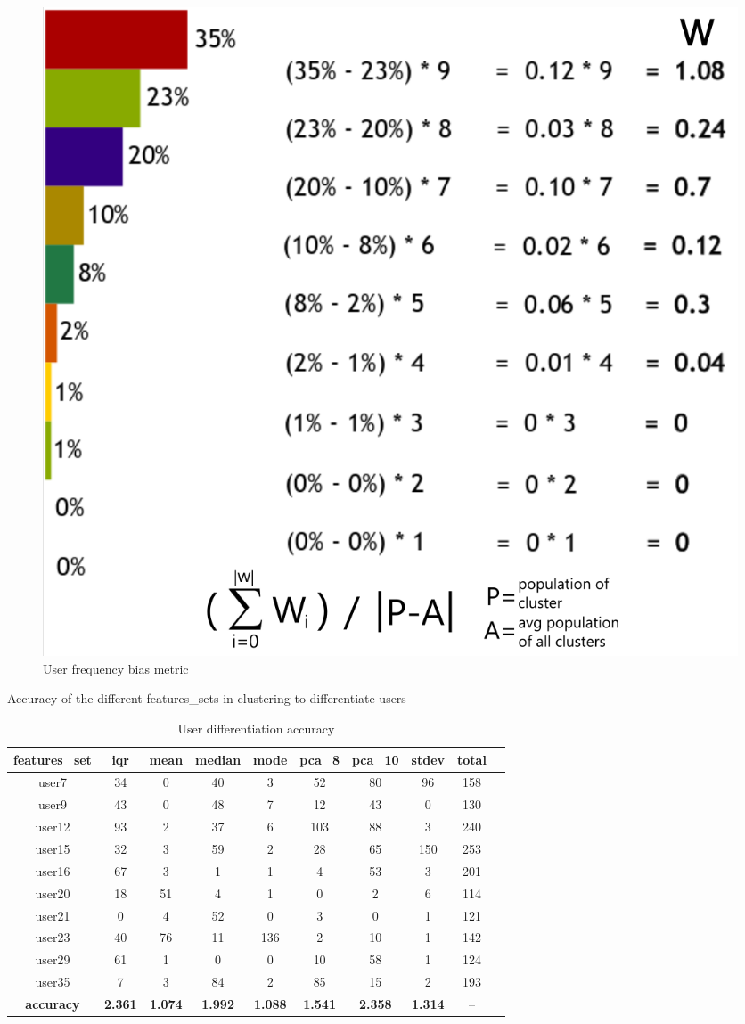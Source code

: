 \begin{figure}[h!]
	\includegraphics[width=.8\columnwidth]{figures/user_freq_distribution}

	\caption{User frequency bias metric}
	\label{fig:user_freq_bias_metric}
\end{figure}

\begin{table}[h!]
	\centering
	\caption{User differentiation accuracy}
	{\small Accuracy of the different features{\_}sets in clustering to differentiate users}
	\bigskip
	\label{tab:user-differentiation-accuracy}
	\begin{tabular}{ |c|c|c|c|c|c|c|c|c|c| }
		\hline
		\textbf{features{\_}set} & \textbf{iqr} & \textbf{mean} & \textbf{median} & \textbf{mode} & \textbf{pca{\_}8} & \textbf{pca{\_}10} & \textbf{stdev} & total \\
		\hline
		user7 & 34 & 0 & 40 & 3 & 52 & 80 & 96 & 158 \\
		user9 & 43 & 0 & 48 & 7 & 12 & 43 & 0 & 130 \\
		user12 & 93 & 2 & 37 & 6 & 103 & 88 & 3 & 240 \\
		user15 & 32 & 3 & 59 & 2 & 28 & 65 & 150 & 253\\
		user16 & 67 & 3 & 1 & 1 & 4 & 53 & 3 & 201\\
		user20 & 18 & 51 & 4 & 1 & 0 & 2 & 6 & 114 \\
		user21 & 0 & 4 & 52 & 0 & 3 & 0 & 1 & 121 \\
		user23 & 40 & 76 & 11 & 136 & 2 & 10 & 1 & 142 \\
		user29 & 61 & 1 & 0 & 0 & 10 & 58 & 1 & 124 \\
		user35 & 7 & 3 & 84 & 2 & 85 & 15 & 2 & 193 \\
		\hline
		\textbf{accuracy} & \textbf{2.361} & \textbf{1.074} & \textbf{1.992} & \textbf{1.088} & \textbf{1.541} & \textbf{2.358} & \textbf{1.314} & -- \\
		\hline
	\end{tabular}
\end{table}

